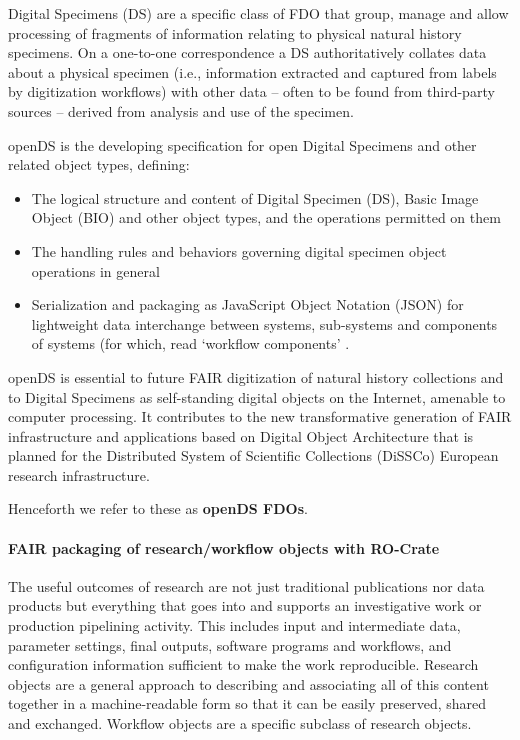 Digital Specimens (DS) are a specific class of FDO that group, manage
and allow processing of fragments of information relating to physical
natural history specimens. On a one-to-one correspondence a DS
authoritatively collates data about a physical specimen (i.e.,
information extracted and captured from labels by digitization
workflows) with other data -- often to be found from third-party sources
-- derived from analysis and use of the specimen.

openDS \cite{ch8-47} is the developing specification for open Digital
Specimens and other related object types, defining: 

\begin{itemize}
  \item The logical
  structure and content of Digital Specimen (DS), Basic Image Object (BIO)
  and other object types, and the operations permitted on them
  \item The
  handling rules and behaviors governing digital specimen object
  operations in general
  \item Serialization and packaging as
  JavaScript Object Notation (JSON) for lightweight data interchange
  between systems, sub-systems and components of systems (for which, read
  `workflow components' \cite{ch8-48}. 
\end{itemize}

openDS is essential to future FAIR
digitization of natural history collections and to Digital Specimens as
self-standing digital objects on the Internet, amenable to computer
processing. It contributes to the new transformative generation of FAIR
infrastructure and applications based on Digital Object Architecture
that is planned for the Distributed System of Scientific Collections
(DiSSCo) \cite{ch8-6,ch8-5,ch8-30} European research infrastructure.

Henceforth we refer to these as \textbf{openDS FDOs}.

\paragraph{FAIR packaging of research/workflow objects with RO-Crate}\label{fair-packaging-of-researchworkflow-objects-with-ro-crate}

The useful outcomes of research are not just traditional publications
nor data products but everything that goes into and supports an
investigative work or production pipelining activity. This includes
input and intermediate data, parameter settings, final outputs, software
programs and workflows, and configuration information sufficient to make
the work reproducible. Research objects \cite{Bechhofer 2013} are a general approach
to describing and associating all of this content together in a
machine-readable form so that it can be easily preserved, shared and
exchanged. Workflow objects are a specific subclass of research objects.

